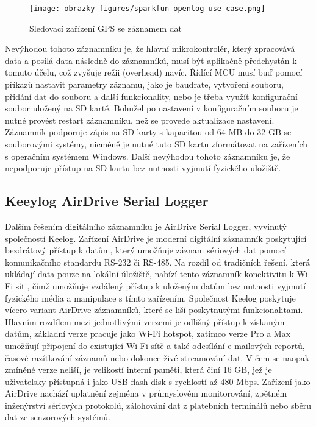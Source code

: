\begin{figure}[h]
    \centering
    \texttt{[image: obrazky-figures/sparkfun-openlog-use-case.png]}
    
    \caption{Sledovací zařízení GPS se záznamem dat \cite{cirkit_openlog}}
    \label{fig:sparkfun-openlog-use-case}
\end{figure}

Nevýhodou tohoto záznamníku je, že hlavní mikrokontrolér, který zpracovává data a posílá data následně do záznamníků, musí být aplikačně předchystán k tomuto účelu, což zvyšuje režii (overhead) navíc. Řídící MCU musí buď pomocí příkazů nastavit parametry záznamu, jako je baudrate, vytvoření souboru, přidání dat do souboru a další funkcionality, nebo je třeba využít konfigurační soubor uložený na SD kartě. Bohužel po nastavení v konfiguračním souboru je nutné provést restart záznamníku, než se provede aktualizace nastavení. Záznamník podporuje zápis na SD karty s kapacitou od 64 MB do 32 GB se souborovými systémy, nicméně je nutné tuto SD kartu zformátovat na zařízeních s operačním systémem Windows. Další nevýhodou tohoto záznamníku je, že nepodporuje přístup na SD kartu bez nutnosti vyjmutí fyzického uložiště.

\subsection{Keeylog AirDrive Serial Logger}
\label{keelog_airdrive_serial_datalogger}
Dalším řešením digitálního záznamníku je AirDrive Serial Logger, vyvinutý společností Keelog. Zařízení AirDrive je moderní digitální záznamník poskytující bezdrátový přístup k datům, který umožňuje záznam sériových dat pomocí komunikačního standardu RS-232 či RS-485. Na rozdíl od tradičních řešení, která ukládají data pouze na lokální úložiště, nabízí tento záznamník konektivitu k Wi-Fi síti, čímž umožňuje vzdálený přístup k uloženým datům bez nutnosti vyjmutí fyzického média a manipulace s tímto zařízením. Společnost Keelog poskytuje vícero variant AirDrive záznamníků, které se liší poskytnutými funkcionalitami. Hlavním rozdílem mezi jednotlivými verzemi je odlišný přístup k získaným datům, základní verze pracuje jako Wi-Fi hotspot, zatímco verze Pro a Max umožňují připojení do existující Wi-Fi sítě a také odesílání e-mailových reportů, časové razítkování záznamů nebo dokonce živé streamování dat. V čem se naopak zmíněné verze neliší, je velikostí interní paměti, která činí 16 GB, jež je uživatelsky přístupná i jako USB flash disk s rychlostí až 480 Mbps. Zařízení jako AirDrive nachází uplatnění zejména v průmyslovém monitorování, zpětném inženýrství sériových protokolů, zálohování dat z platebních terminálů nebo sběru dat ze senzorových systémů. \cite{keelog_airdrive_serial_datalogger, keelog_airdrive_serial_datalogger_max, keelog_airdrive_serial_datalogger_pro}

